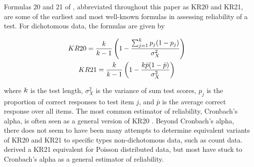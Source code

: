 \documentclass[12pt,epsfig]{article}
\newcommand{\changed}[1]{\textcolor{black}{#1}}
\newcommand{\testlength}{\changed{k}}%
\begin{document}
Formulas 20 and 21 of \cite{Kuder1937}, abbreviated throughout this paper as KR20 and KR21, are some of the earliest and most well-known formulas in assessing reliability of a test. For dichotomous data, the formulas are given by

\begin{gather*}
KR20 = \dfrac{\testlength}{\testlength-1} \left(1 -  \dfrac{\sum_{j = 1}^{\testlength} p_j (1 - p_j)}{\sigma^2_X}\right)\\
KR21 = \dfrac{\testlength}{\testlength-1} \left( 1 - \dfrac{\testlength \bar{p}(1 - \bar{p})}{\sigma^2_X}\right)
\end{gather*} 

\noindent where $\testlength$ is the test length, $\sigma^2_X$ is the variance of sum test scores, $p_j$ is the proportion of correct responses to test item $j$, and $\bar{p}$ is the average correct response over all items. The most common estimator of reliability, Cronbach's alpha, is often seen as a general version of KR20 \citep{Cronbach1951}.  Beyond Cronbach's alpha, there does not seem to have been many attempts to determine equivalent variants of KR20 and KR21 to specific types non-dichotomous data, such as count data. \cite{Allison1978} derived a KR21 equivalent for Poisson distributed data, but most have stuck to Cronbach's alpha as a general estimator of reliability. %
\end{document}
